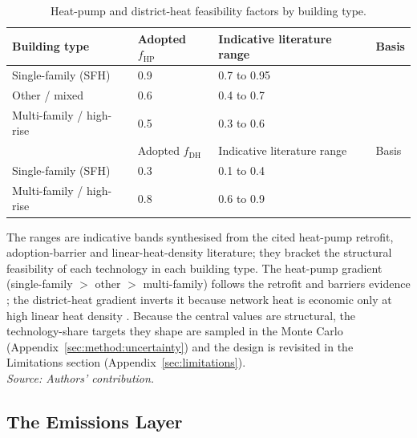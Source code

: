 \begin{table}[H]
\centering
\caption{Heat-pump and district-heat feasibility factors by building type.}
\label{tab:feasibility}
\begin{tabularx}{\textwidth}{lXXX}
\toprule
Building type & Adopted $f_{\mathrm{HP}}$ & Indicative literature range
             & Basis \\
\midrule
Single-family (SFH)       & 0.9 & 0.7 to 0.95 & \citet{Gibb2023Coming,IRENA2022heatpumps} \\
Other / mixed             & 0.6 & 0.4 to 0.7  & \citet{Corbett2023Pumping,JRC2023smallheating} \\
Multi-family / high-rise  & 0.5 & 0.3 to 0.6  & \citet{JRC2023smallheating,IRENA2022heatpumps} \\
\midrule
 & Adopted $f_{\mathrm{DH}}$ & Indicative literature range & Basis \\
\midrule
Single-family (SFH)       & 0.3 & 0.1 to 0.4  & \citet{Persson2019Heat} \\
Multi-family / high-rise  & 0.8 & 0.6 to 0.9  & \citet{Persson2019Heat} \\
\bottomrule
\end{tabularx}
\par\addvspace{8pt}
\raggedright\small
The ranges are indicative bands synthesised from the cited heat-pump retrofit,
adoption-barrier and linear-heat-density literature; they bracket the structural feasibility of each technology in each
building type. The heat-pump gradient (single-family $>$ other $>$ multi-family)
follows the retrofit and barriers evidence
\citep{Gibb2023Coming,Corbett2023Pumping};
the district-heat gradient inverts it because network heat is economic only at
high linear heat density \citep{Persson2019Heat}. Because the central values are
structural, the technology-share targets they shape are sampled in the Monte
Carlo (Appendix~\ref{sec:method:uncertainty}) and the design is revisited in the
Limitations section (Appendix~\ref{sec:limitations}).
\\[2pt]{\footnotesize\textit{Source: Authors' contribution.}}
\end{table}


\subsection{The Emissions Layer}
\label{sec:method:emissions}

